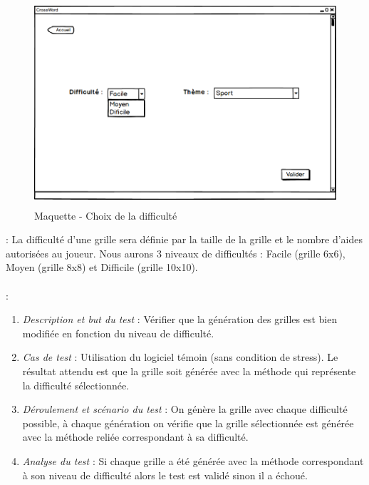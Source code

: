 \documentclass [ 11 pt ] {article}
\begin{document}
    \begin{figure}[H]
    \begin{center}
        \includegraphics[height=3in]{Maquettes/ChoixDiff_deroule.png}
        \caption{Maquette - Choix de la difficulté} 
        \end{center}
    \end{figure}

 :  La difficulté d'une grille sera définie par la taille de la grille et le nombre d'aides autorisées au joueur. Nous aurons 3 niveaux de difficultés : Facile (grille 6x6), Moyen (grille 8x8) et Difficile (grille 10x10). \\ \\
 : 
 \begin{tcolorbox}[colback=positifC]
            \begin{enumerate}
                \item \textit{Description et but du test }: Vérifier que la génération des grilles est bien modifiée en fonction du niveau de difficulté.

                
                \item \textit{Cas de test }: Utilisation du logiciel témoin (sans condition de stress). Le résultat attendu est que la grille soit générée avec la méthode qui représente la difficulté sélectionnée.
                
                \item \textit{Déroulement et scénario du test }: On génère la grille avec chaque difficulté possible, à chaque génération on vérifie que la grille sélectionnée est générée avec la méthode reliée correspondant à sa difficulté.
                
                \item \textit{Analyse du test }: Si chaque grille a été générée avec la méthode correspondant à son niveau de difficulté alors le test est validé sinon il a échoué.
            \end{enumerate}
        \end{tcolorbox}
        
\end{document}
